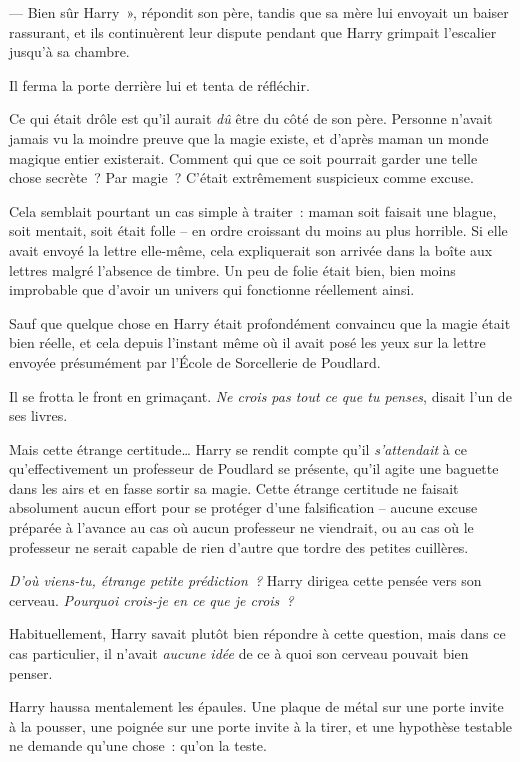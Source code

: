 --- Bien sûr Harry~», répondit son père, tandis que sa mère lui envoyait un baiser rassurant, et ils continuèrent leur dispute pendant que Harry grimpait l'escalier jusqu'à sa chambre.

Il ferma la porte derrière lui et tenta de réfléchir.

Ce qui était drôle est qu'il aurait \emph{dû} être du côté de son père. Personne n'avait jamais vu la moindre preuve que la magie existe, et d'après maman un monde magique entier existerait. Comment qui que ce soit pourrait garder une telle chose secrète~? Par magie~? C'était extrêmement suspicieux comme excuse.

Cela semblait pourtant un cas simple à traiter~: maman soit faisait une blague, soit mentait, soit était folle -- en ordre croissant du moins au plus horrible. Si elle avait envoyé la lettre elle-même, cela expliquerait son arrivée dans la boîte aux lettres malgré l'absence de timbre. Un peu de folie était bien, bien moins improbable que d'avoir un univers qui fonctionne réellement ainsi.

Sauf que quelque chose en Harry était profondément convaincu que la magie était bien réelle, et cela depuis l'instant même où il avait posé les yeux sur la lettre envoyée présumément par l'École de Sorcellerie de Poudlard.

Il se frotta le front en grimaçant. \emph{Ne crois pas tout ce que tu penses}, disait l'un de ses livres.

Mais cette étrange certitude… Harry se rendit compte qu'il \emph{s'attendait} à ce qu'effectivement un professeur de Poudlard se présente, qu'il agite une baguette dans les airs et en fasse sortir sa magie. Cette étrange certitude ne faisait absolument aucun effort pour se protéger d'une falsification -- aucune excuse préparée à l'avance au cas où aucun professeur ne viendrait, ou au cas où le professeur ne serait capable de rien d'autre que tordre des petites cuillères.

\emph{D'où viens-tu, étrange petite prédiction~?} Harry dirigea cette pensée vers son cerveau. \emph{Pourquoi crois-je en ce que je crois~?}

Habituellement, Harry savait plutôt bien répondre à cette question, mais dans ce cas particulier, il n'avait \emph{aucune idée} de ce à quoi son cerveau pouvait bien penser.

Harry haussa mentalement les épaules. Une plaque de métal sur une porte invite à la pousser, une poignée sur une porte invite à la tirer, et une hypothèse testable ne demande qu'une chose~: qu'on la teste.

